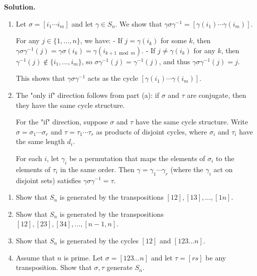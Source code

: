 \noindent\textbf{Solution.}
\begin{enumerate}[label=(\alph*)]
\item Let $\sigma = [i_1 \cdots i_m]$ and let $\gamma \in S_n$. We show that $\gamma\sigma\gamma^{-1} = [\gamma(i_1) \cdots \gamma(i_m)]$.

For any $j \in \{1, \ldots, n\}$, we have:
- If $j = \gamma(i_k)$ for some $k$, then $\gamma\sigma\gamma^{-1}(j) = \gamma\sigma(i_k) = \gamma(i_{k+1 \bmod m})$.
- If $j \neq \gamma(i_k)$ for any $k$, then $\gamma^{-1}(j) \notin \{i_1, \ldots, i_m\}$, so $\sigma\gamma^{-1}(j) = \gamma^{-1}(j)$, and thus $\gamma\sigma\gamma^{-1}(j) = j$.

This shows that $\gamma\sigma\gamma^{-1}$ acts as the cycle $[\gamma(i_1) \cdots \gamma(i_m)]$.

\item The "only if" direction follows from part (a): if $\sigma$ and $\tau$ are conjugate, then they have the same cycle structure.

For the "if" direction, suppose $\sigma$ and $\tau$ have the same cycle structure. Write $\sigma = \sigma_1 \cdots \sigma_r$ and $\tau = \tau_1 \cdots \tau_r$ as products of disjoint cycles, where $\sigma_i$ and $\tau_i$ have the same length $d_i$.

For each $i$, let $\gamma_i$ be a permutation that maps the elements of $\sigma_i$ to the elements of $\tau_i$ in the same order. Then $\gamma = \gamma_1 \cdots \gamma_r$ (where the $\gamma_i$ act on disjoint sets) satisfies $\gamma\sigma\gamma^{-1} = \tau$.
\end{enumerate}

\begin{problembox}
\begin{enumerate}[label=(\alph*)]
\item Show that $S_n$ is generated by the transpositions $[12], [13], \ldots, [1n]$.
\item Show that $S_n$ is generated by the transpositions $[12], [23], [34], \ldots, [n - 1, n]$.
\item Show that $S_n$ is generated by the cycles $[12]$ and $[123 \ldots n]$.
\item Assume that $n$ is prime. Let $\sigma = [123 \ldots n]$ and let $\tau = [rs]$ be any transposition. Show that $\sigma, \tau$ generate $S_n$.
\end{enumerate}
\end{problembox}

